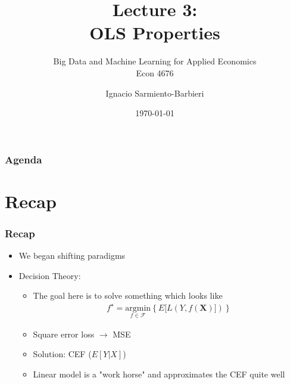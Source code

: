 \documentclass[
  shownotes,
  xcolor={svgnames},
  hyperref={colorlinks,citecolor=DarkBlue,linkcolor=DarkRed,urlcolor=DarkBlue}
  , aspectratio=169]{beamer}
\begin{document}
\title[Lecture 3]{Lecture 3: \\ OLS Properties}
\subtitle{Big Data and Machine Learning for Applied Economics \\ Econ 4676}
\date{\today}

\author[Sarmiento-Barbieri]{Ignacio Sarmiento-Barbieri}


\begin{frame}[noframenumbering]
\maketitle
\end{frame}





\begin{frame}
\frametitle{Agenda}

\tableofcontents


\end{frame}



\section{Recap}

\begin{frame}
\frametitle{Recap}

\begin{itemize} 
    \item We began shifting paradigms
    \medskip
    
    \item Decision Theory: 
    \medskip
    \begin{itemize}
      \item The goal here is to solve something which looks like
\begin{align}
f^\star=\underset{f\in\mathcal{F}}{\text{argmin}}\left\lbrace E [L(Y,f(\mathbf{X})]) \right\rbrace
\end{align}
\item Square error loss $\rightarrow$ MSE
\medskip
\item Solution: CEF ($E[Y|X]$) 
\medskip
    \item Linear model is a "work horse" and approximates the CEF quite well 
    \end{itemize}

  
\end{itemize}
\end{frame}
\end{document}
